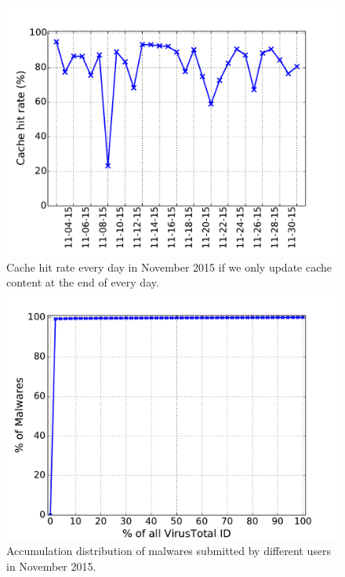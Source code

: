 \begin{figure}[!htb]
  \includegraphics[width=\linewidth]{figure/LRU_day}
{
Cache hit rate every day in November 2015 if we only update cache content at the end of every day.
}
\endminipage\hfill
{}
  \includegraphics[width=\linewidth]{figure/id}
{Accumulation distribution of malwares submitted by different users in November 2015.}
\endminipage\hfill
{}%

\end{figure}
